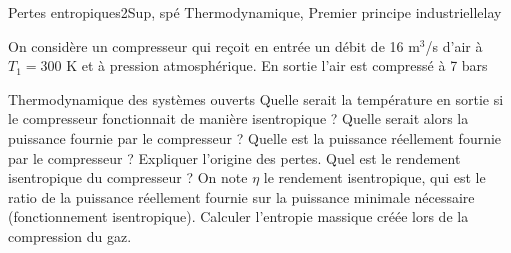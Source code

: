 \begin{exercise}{Pertes entropiques}{2}{Sup, spé}
{Thermodynamique, Premier principe industriel}{lelay}

On considère un compresseur qui reçoit en entrée un débit de 16 m$^3$/s d'air à $T_1 = 300$ K et à pression atmosphérique. En sortie l'air est compressé à 7 bars

\begin{questions}
    \questioncours Thermodynamique des systèmes ouverts
    \question Quelle serait la température en sortie si le compresseur fonctionnait de manière isentropique ? Quelle serait alors la puissance fournie par le compresseur ?
    \question Quelle est la puissance réellement fournie par le compresseur ? Expliquer l'origine des pertes.
    \question Quel est le rendement isentropique du compresseur ? On note $\eta$ le rendement isentropique, qui est le ratio de la puissance réellement fournie sur la puissance minimale nécessaire (fonctionnement isentropique).
    \question Calculer l'entropie massique créée lors de la compression du gaz.
\end{questions}

\end{exercise}
